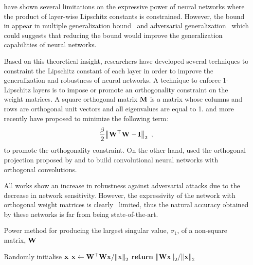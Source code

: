 \noindent
\citet{huster2018limitations} have shown several limitations on the expressive power of neural networks where the product of layer-wise Lipschitz constants is constrained.
However, the bound in  appear in multiple generalization bound~\cite{neyshabur2017,bartlett2017spectrally,golowich2018} and adversarial generalization~\cite{farnia2018generalizable} which could suggests that reducing the bound would improve the generalization capabilities of neural networks.




Based on this theoretical insight, researchers have developed several techniques to constraint the Lipschitz constant of each layer in order to improve the generalization and robustness of neural networks.
A technique to enforce 1-Lipschitz layers is to impose or promote an orthogonality constraint on the weight matrices.
A square orthogonal matrix $\mathbf{M}$ is a matrix whose columns and rows are orthogonal unit vectors and all eigenvalues are equal to 1.
\citet{cisse2017parseval} and more recently \citet{wang2020orthogonal,huang2020controllable} have proposed to minimize the following term:
\begin{equation}
  \frac{\beta}{2} \norm{\mathbf{W}^\top \mathbf{W} - \mathbf{I}}_2  \enspace, 
\end{equation}
to promote the orthogonality constraint.
On the other hand, \citet{li2019preventing} used the orthogonal projection proposed by \citet{kautsky1994matrix} and \citet{xiao2018dynamical} to build convolutional neural networks with orthogonal convolutions.

All works show an increase in robustness against adversarial attacks due to the decrease in network sensitivity.
However, the expressivity of the network with orthogonal weight matrices is clearly  limited, thus the natural accuracy obtained by these networks is far from being state-of-the-art. 


\begin{algorithm}[ht]
  \caption{Power method for producing the largest singular value, $\sigma_1$, of a non-square matrix, $\mathbf{W}$ \cite{gouk2018regularisation,golub2000eigenvalue}}
  \begin{algorithmic}[1]
    \State Randomly initialise $\mathbf{x}$
      \State $\mathbf{x} \gets \mathbf{W}^\top \mathbf{W} \mathbf{x} / \norm{\mathbf{x}}_2$
    \EndFor
    \State \textbf{return} $\norm{\mathbf{W} \mathbf{x}}_2 / \norm{\mathbf{x}}_2$
  \end{algorithmic}
  \label{algorithm:ch3-power_method}
\end{algorithm}


